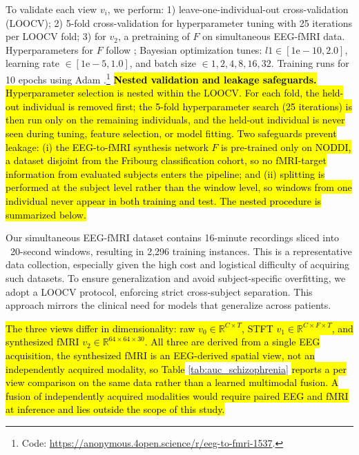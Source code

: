 \documentclass{article}
\begin{document}
To validate each view $v_i$, we perform: 1) leave-one-individual-out cross-validation (LOOCV); 2) 5-fold cross-validation for hyperparameter tuning with 25 iterations per LOOCV fold; 3) for $v_2$, a pretraining of $F$ on simultaneous EEG-fMRI data. Hyperparameters for $F$ follow \cite{calhas2022eeg}; Bayesian optimization \cite{snoek2012practical} tunes: $l1 \in [1\mbox{e}-10, 2.0]$, learning rate $\in [1\mbox{e}-5, 1.0]$, and batch size $\in {1,2,4,8,16,32}$. Training runs for 10 epochs using Adam \cite{kingma2014adam}.\footnote{Code: \url{https://anonymous.4open.science/r/eeg-to-fmri-1537}.} \hl{\textbf{Nested validation and leakage safeguards.} Hyperparameter selection is nested within the LOOCV. For each fold, the held-out individual is removed first; the 5-fold hyperparameter search (25 iterations) is then run only on the remaining individuals, and the held-out individual is never seen during tuning, feature selection, or model fitting. Two safeguards prevent leakage: (i) the EEG-to-fMRI synthesis network $F$ is pre-trained only on NODDI, a dataset disjoint from the Fribourg classification cohort, so no fMRI-target information from evaluated subjects enters the pipeline; and (ii) splitting is performed at the subject level rather than the window level, so windows from one individual never appear in both training and test. The nested procedure is summarized below.}

Our simultaneous EEG-fMRI dataset contains 16-minute recordings sliced into ~20-second windows, resulting in 2,296 training instances. This is a representative data collection, especially given the high cost and logistical difficulty of acquiring such datasets. To ensure generalization and avoid subject-specific overfitting, we adopt a LOOCV protocol, enforcing strict cross-subject separation. This approach mirrors the clinical need for models that generalize across patients. 

\hl{The three views differ in dimensionality: raw $v_0 \in \mathbb{R}^{C\times T}$, STFT $v_1 \in \mathbb{R}^{C\times F\times T}$, and synthesized fMRI $v_2 \in \mathbb{R}^{64\times 64\times 30}$. All three are derived from a single EEG acquisition, the synthesized fMRI is an EEG-derived spatial view, not an independently acquired modality, so Table }\ref{tab:auc_schizophrenia}\hl{ reports a per view comparison on the same data rather than a learned multimodal fusion. A fusion of independently acquired modalities would require paired EEG and fMRI at inference and lies outside the scope of this study.}
\end{document}

